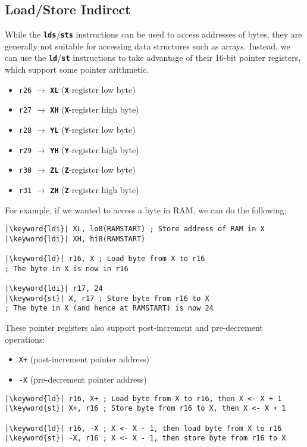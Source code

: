 \documentclass[a4paper]{report}
\newcommand{\keyword}[1]{\textcolor[rgb]{0.00,0.50,0.00}{\textbf{#1}}}
\newcommand{\keywordinline}[1]{\textcolor[rgb]{0.00,0.50,0.00}{\textbf{\texttt{#1}}}}
\begin{document}
\subsection{Load/Store Indirect}
While the \keywordinline{lds}/\keywordinline{sts} instructions can be
used to access addresses of bytes, they are generally not suitable for
accessing data structures such as arrays. Instead, we can use the
\keywordinline{ld}/\keywordinline{st} instructions to take advantage of
their 16-bit pointer registers, which support some pointer arithmetic.
\begin{itemize}
    \item \texttt{r26} \(\to\) \keywordinline{XL} (\keywordinline{X}-register low byte)
    \item \texttt{r27} \(\to\) \keywordinline{XH} (\keywordinline{X}-register high byte)
    \item \texttt{r28} \(\to\) \keywordinline{YL} (\keywordinline{Y}-register low byte)
    \item \texttt{r29} \(\to\) \keywordinline{YH} (\keywordinline{Y}-register high byte)
    \item \texttt{r30} \(\to\) \keywordinline{ZL} (\keywordinline{Z}-register low byte)
    \item \texttt{r31} \(\to\) \keywordinline{ZH} (\keywordinline{Z}-register high byte)
\end{itemize}
For example, if we wanted to access a byte in RAM, we can do the following:
\begin{verbatim}
|\keyword{ldi}| XL, lo8(RAMSTART) ; Store address of RAM in X
|\keyword{ldi}| XH, hi8(RAMSTART)

|\keyword{ld}| r16, X ; Load byte from X to r16
; The byte in X is now in r16

|\keyword{ldi}| r17, 24
|\keyword{st}| X, r17 ; Store byte from r16 to X
; The byte in X (and hence at RAMSTART) is now 24
\end{verbatim}
These pointer registers also support post-increment and pre-decrement
operations:
\begin{itemize}
    \item \texttt{X+} (post-increment pointer address)
    \item \texttt{-X} (pre-decrement pointer address)
\end{itemize}
\begin{verbatim}
|\keyword{ld}| r16, X+ ; Load byte from X to r16, then X <- X + 1
|\keyword{st}| X+, r16 ; Store byte from r16 to X, then X <- X + 1

|\keyword{ld}| r16, -X ; X <- X - 1, then load byte from X to r16
|\keyword{st}| -X, r16 ; X <- X - 1, then store byte from r16 to X
\end{verbatim}
\end{document}
